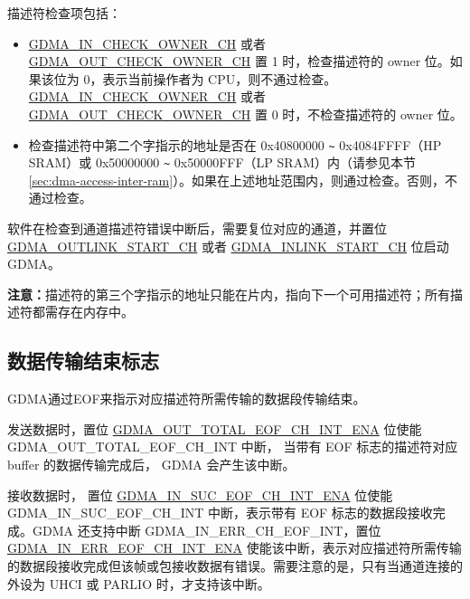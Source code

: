 \documentclass[main\_\_CN.tex]{subfiles}
\begin{document}
描述符检查项包括：
\begin{itemize}
    \item \hyperref[fielddesc:GDMAINCHECKOWNERCHN]{GDMA\_IN\_CHECK\_OWNER\_CH} 或者 \hyperref[fielddesc:GDMAOUTCHECKOWNERCHN]{GDMA\_OUT\_CHECK\_OWNER\_CH} 置 1 时，检查描述符的 owner 位。如果该位为 0，表示当前操作者为 CPU，则不通过检查。\hyperref[fielddesc:GDMAINCHECKOWNERCHN]{GDMA\_IN\_CHECK\_OWNER\_CH} 或者 \hyperref[fielddesc:GDMAOUTCHECKOWNERCHN]{GDMA\_OUT\_CHECK\_OWNER\_CH} 置 0 时，不检查描述符的 owner 位。\\

    \item 检查描述符中第二个字指示的地址是否在 0x40800000 \verb+~+ 0x4084FFFF（HP SRAM）或 0x50000000 \verb+~+ 0x50000FFF（LP SRAM）内（请参见本节 \ref{sec:dma-access-inter-ram}）。如果在上述地址范围内，则通过检查。否则，不通过检查。\\
\end{itemize}

软件在检查到通道描述符错误中断后，需要复位对应的通道，并置位 \hyperref[fielddesc:GDMAOUTLINKSTARTCHN]{GDMA\_OUTLINK\_START\_CH} 或者  \hyperref[fielddesc:GDMAINLINKSTARTCHN]{GDMA\_INLINK\_START\_CH} 位启动 GDMA。

{\bfseries 注意：}描述符的第三个字指示的地址只能在片内，指向下一个可用描述符；所有描述符都需存在内存中。


\subsection{数据传输结束标志}

GDMA通过EOF来指示对应描述符所需传输的数据段传输结束。

发送数据时，置位 \hyperref[fielddesc:GDMAOUTTOTALEOFCHNINTENA]{GDMA\_OUT\_TOTAL\_EOF\_CH\_INT\_ENA} 位使能  GDMA\_OUT\_TOTAL\_EOF\_CH\_INT 中断， 当带有 EOF 标志的描述符对应 buffer 的数据传输完成后， GDMA 会产生该中断。

接收数据时， 置位 \hyperref[fielddesc:GDMAINSUCEOFCHNINTENA]{GDMA\_IN\_SUC\_EOF\_CH\_INT\_ENA} 位使能 GDMA\_IN\_SUC\_EOF\_CH\_INT 中断，表示带有 EOF 标志的数据段接收完成。GDMA 还支持中断 GDMA\_IN\_ERR\_CH\_EOF\_INT，置位 \hyperref[fielddesc:GDMAINERREOFCHNINTENA]{GDMA\_IN\_ERR\_EOF\_CH\_INT\_ENA} 使能该中断，表示对应描述符所需传输的数据段接收完成但该帧或包接收数据有错误。需要注意的是，只有当通道连接的外设为 UHCI 或 PARLIO 时，才支持该中断。
\end{document}

